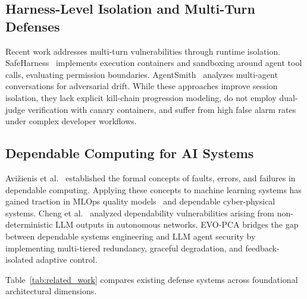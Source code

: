 \documentclass[conference]{IEEEtran}
\begin{document}
\subsection{Harness-Level Isolation and Multi-Turn Defenses}
Recent work addresses multi-turn vulnerabilities through runtime isolation. SafeHarness~\cite{liu2024safeharness} implements execution containers and sandboxing around agent tool calls, evaluating permission boundaries. AgentSmith~\cite{sharma2024agentsmith} analyzes multi-agent conversations for adversarial drift. While these approaches improve session isolation, they lack explicit kill-chain progression modeling, do not employ dual-judge verification with canary containers, and suffer from high false alarm rates under complex developer workflows.

\subsection{Dependable Computing for AI Systems}
Avi\v{z}ienis et al.~\cite{avizienis2004basic} established the formal concepts of faults, errors, and failures in dependable computing. Applying these concepts to machine learning systems has gained traction in MLOps quality models~\cite{siebert2022mlops} and dependable cyber-physical systems. Cheng et al.~\cite{dsn2024llm} analyzed dependability vulnerabilities arising from non-deterministic LLM outputs in autonomous networks. EVO-PCA bridges the gap between dependable systems engineering and LLM agent security by implementing multi-tiered redundancy, graceful degradation, and feedback-isolated adaptive control.

Table~\ref{tab:related_work} compares existing defense systems across foundational architectural dimensions.
\end{document}
